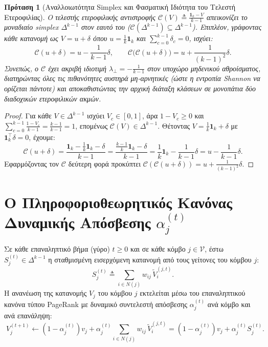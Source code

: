 \documentclass[11pt, a4paper]{article}
\newtheorem{proposition}{Πρόταση}
\theoremstyle{definition}
\theoremstyle{definition}
\begin{document}
\begin{proposition}[Αναλλοιωτότητα Simplex και Φασματική Ιδιότητα του Τελεστή Ετεροφιλίας]\label{prop:simplex_gr}
Ο τελεστής ετεροφιλικής αντιστροφής $\mathcal{C}(V) \triangleq \frac{\mathbf{1}_k - V}{k - 1}$ απεικονίζει το μοναδιαίο simplex $\Delta^{k-1}$ στον εαυτό του ($\mathcal{C}(\Delta^{k-1}) \subseteq \Delta^{k-1}$). Επιπλέον, γράφοντας κάθε κατανομή ως $V = u + \delta$ όπου $u = \frac{1}{k}\mathbf{1}_k$ και $\sum_{c=0}^{k-1} \delta_c = 0$, ισχύει:
\begin{equation}\label{eq:eigen_c_gr}
\mathcal{C}(u + \delta) = u - \frac{1}{k - 1}\delta, \qquad \mathcal{C}\big(\mathcal{C}(u + \delta)\big) = u + \frac{1}{(k - 1)^2}\delta.
\end{equation}
Συνεπώς, ο $\mathcal{C}$ έχει ακριβή ιδιοτιμή $\lambda_\perp = -\frac{1}{k-1}$ στον υποχώρο μηδενικού αθροίσματος, διατηρώντας όλες τις πιθανότητες αυστηρά μη-αρνητικές (ώστε η εντροπία Shannon να ορίζεται πάντοτε) και αποκαθιστώντας την αρχική διάταξη κλάσεων σε μονοπάτια δύο διαδοχικών ετεροφιλικών ακμών.
\end{proposition}

\begin{proof}
Για κάθε $V \in \Delta^{k-1}$ ισχύει $V_{c} \in [0, 1]$, άρα $1 - V_{c} \ge 0$ και $\sum_{c=0}^{k-1} \frac{1 - V_c}{k - 1} = \frac{k - 1}{k - 1} = 1$, επομένως $\mathcal{C}(V) \in \Delta^{k-1}$. Θέτοντας $V = \frac{1}{k}\mathbf{1}_k + \delta$ με $\mathbf{1}_k^\top \delta = 0$, έχουμε:
\[
\mathcal{C}(u + \delta) = \frac{\mathbf{1}_k - \frac{1}{k}\mathbf{1}_k - \delta}{k - 1} = \frac{\frac{k-1}{k}\mathbf{1}_k - \delta}{k - 1} = \frac{1}{k}\mathbf{1}_k - \frac{1}{k - 1}\delta = u - \frac{1}{k - 1}\delta.
\]
Εφαρμόζοντας τον $\mathcal{C}$ δεύτερη φορά προκύπτει $\mathcal{C}(\mathcal{C}(u + \delta)) = u + \frac{1}{(k-1)^2}\delta$.
\end{proof}

\section{Ο Πληροφοριοθεωρητικός Κανόνας Δυναμικής Απόσβεσης \texorpdfstring{$\alpha_j^{(t)}$}{alpha\_j\^(t)}}

Σε κάθε επαναληπτικό βήμα (γύρο) $t \ge 0$ και σε κάθε κόμβο $j \in \mathcal{V}$, έστω $S_j^{(t)} \in \Delta^{k-1}$ η σταθμισμένη εισερχόμενη κατανομή από τους γείτονες του κόμβου $j$:
\begin{equation}\label{eq:Sj_def_gr}
S_j^{(t)} \triangleq \sum_{i \in N(j)} w_{ij}\,\tilde{V}_i^{(j,t)}.
\end{equation}
Η ανανέωση της κατανομής $V_j$ του κόμβου $j$ εκτελείται μέσω του επαναληπτικού κανόνα τύπου PageRank με δυναμικό συντελεστή απόσβεσης $\alpha_j^{(t)}$ ανά κόμβο και ανά επανάληψη:
\begin{equation}\label{eq:main_update_gr}
\boxed{\;V_j^{(t+1)} \leftarrow \left(1 - \alpha_j^{(t)}\right) v_j + \alpha_j^{(t)} \sum_{i \in N(j)} w_{ij}\,\tilde{V}_i^{(j,t)} = \left(1 - \alpha_j^{(t)}\right) v_j + \alpha_j^{(t)} S_j^{(t)}.\;}
\end{equation}
\end{document}
